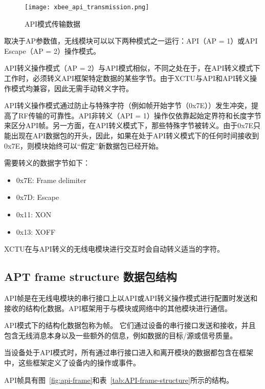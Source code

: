 \begin{figure}[htbp]
    \centering
    \texttt{[image: xbee\_api\_transmission.png]}
    \caption{API模式传输数据}
    \label{fig:xbee_api_transmission}
\end{figure}


取决于AP参数值，无线模块可以以下两种模式之一运行：API（AP = 1）或API Escape（AP = 2）操作模式。

API转义操作模式（AP = 2）与API模式相似，不同之处在于，在API转义模式下工作时，必须转义API框架特定数据的某些字节。由于XCTU与API和API转义操作模式均兼容，因此无需手动转义字符。

API转义操作模式通过防止与特殊字符（例如帧开始字节（0x7E））发生冲突，提高了RF传输的可靠性。API非转义（API = 1）操作仅依靠起始定界符和长度字节来区分API帧。另一方面，在API转义模式下，那些特殊字节被转义。由于0x7E只能出现在API数据包的开头，因此，如果在处于API转义模式下的任何时间接收到0x7E，则模块始终可以“假定”新数据包已经开始。



需要转义的数据字节如下：

\begin{itemize}
    \item 0x7E: Frame delimiter
    \item 0x7D: Escape
    \item 0x11: XON
    \item 0x13: XOFF    
\end{itemize}

XCTU在与API转义的无线电模块进行交互时会自动转义适当的字符。

\subsection{APT frame structure 数据包结构}

API帧是在无线电模块的串行接口上​​以API或API转义操作模式进行配置时发送和接收的结构化数据。API框架用于与模块或网络中的其他模块进行通信。

API模式下的结构化数据包称为帧。 它们通过设备的串行接口发送和接收，并且包含无线消息本身以及一些额外的信息，例如数据的目标/源或信号质量。

当设备处于API模式时，所有通过串行接口进入和离开模块的数据都包含在框架中，这些框架定义了设备内的操作或事件。

API帧具有图~\ref{fig:api-frame}和表~\ref{tab:API-frame-structure}所示的结构。

